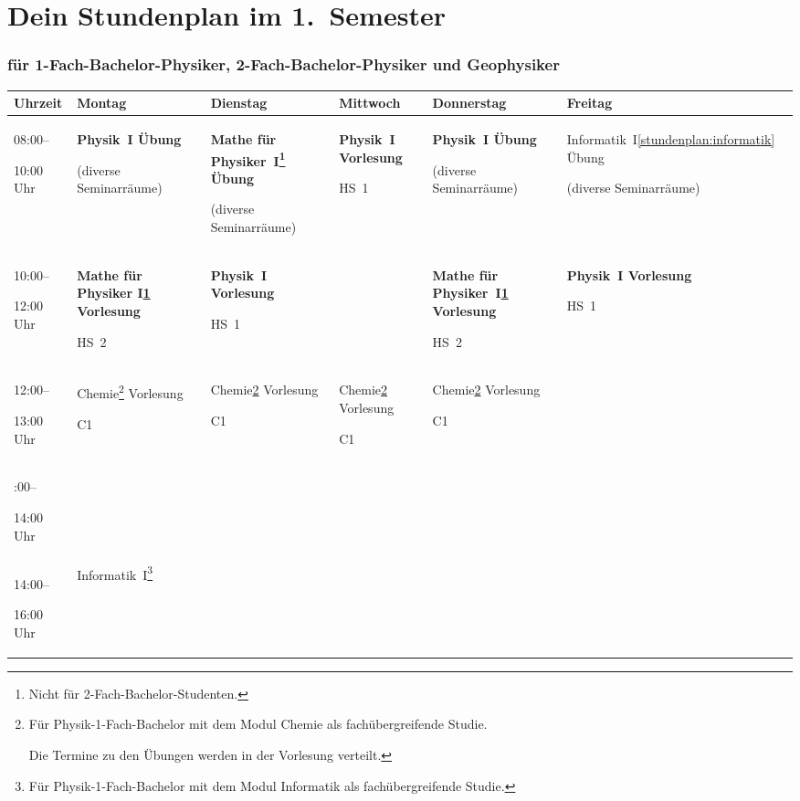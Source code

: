 
\section{Dein Stundenplan im 1.\ Semester}
\vspace{-0.15cm}
\subsubsection*{für 1-Fach-Bachelor-Physiker, 2-Fach-Bachelor-Physiker und Geophysiker}
\begin{minipage}{\textwidth}
\setfootnoterule{0cm}
\setlength{\temp}{0.152\textwidth}
\let\fibnl\par

\centering
\begin{tabular}{| >{\footnotesize}p{} | *{5}{>{\footnotesize\centering\arraybackslash}p{\temp}|}}
\hline
	Uhrzeit &
	Montag &
	Dienstag &
	Mittwoch &
	Donnerstag &
	Freitag
\\ \hline
08:00--\fibnl 10:00 Uhr &
	\textbf{Physik~I Übung}\fibnl(diverse Seminarräume) &
	\textbf{Mathe für Physiker~I\footnote{Nicht für 2-Fach-Bachelor-Studenten.\label{stundenplan:mfp1}} Übung}\fibnl(diverse Seminarräume) &
	\textbf{Physik~I Vorlesung}\fibnl HS~1 &
	\textbf{Physik~I Übung}\fibnl(diverse Seminarräume) &
	Informatik~I\cref{stundenplan:informatik} Übung\fibnl(diverse Seminarräume)
\\ \hline
10:00--\fibnl 12:00 Uhr &
	\textbf{Mathe für Physiker I\cref{stundenplan:mfp1} Vorlesung}\fibnl HS~2 &
	\textbf{Physik~I Vorlesung}\fibnl HS~1 &
	&
	\textbf{Mathe für Physiker~I\cref{stundenplan:mfp1} Vorlesung}\fibnl HS~2 &
	\textbf{Physik~I Vorlesung}\fibnl HS~1
\\ \hline
12:00--\fibnl 13:00 Uhr &
	Chemie\footnote{Für Physik-1-Fach-Bachelor mit dem Modul Chemie als fachübergreifende Studie.
	
	\noindent Die Termine zu den Übungen werden in der Vorlesung verteilt.\label{stundenplan:chemie}} Vorlesung\fibnl C1 &
	Chemie\cref{stundenplan:chemie} Vorlesung\fibnl C1 &
	Chemie\cref{stundenplan:chemie} Vorlesung\fibnl C1 &
	Chemie\cref{stundenplan:chemie} Vorlesung\fibnl C1 &
\\ \hdashline
13:00--\fibnl 14:00 Uhr &
	& & & &
\\ \hline
14:00--\fibnl 16:00 Uhr &
	Informatik~I\footnote{Für Physik-1-Fach-Bachelor mit dem Modul Informatik als fachübergreifende Studie.
	
}
\end{tabular}
\end{minipage}
